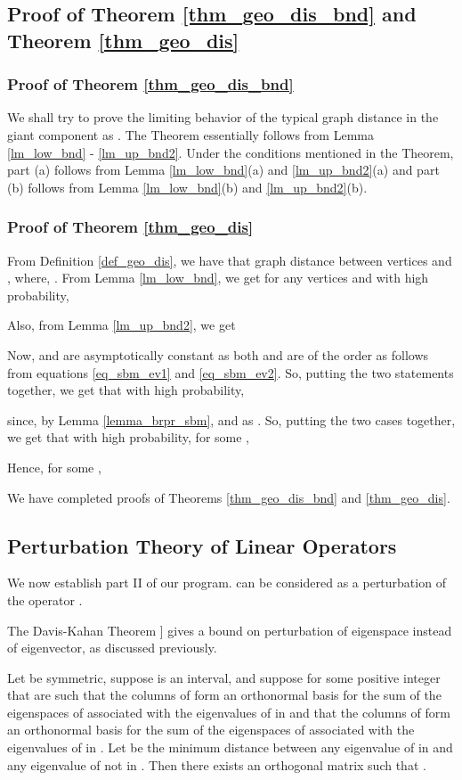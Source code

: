 \documentclass[graybox]{svmult}
\begin{document}
\subsection{Proof of Theorem \ref{thm_geo_dis_bnd} and Theorem \ref{thm_geo_dis}}
\label{sec_det_geo}
\subsubsection{Proof of Theorem \ref{thm_geo_dis_bnd}}
We shall try to prove the limiting behavior of the typical graph distance in the giant component as . The Theorem essentially follows from Lemma \ref{lm_low_bnd} - \ref{lm_up_bnd2}. Under the conditions mentioned in the Theorem, part (a) follows from Lemma \ref{lm_low_bnd}(a) and \ref{lm_up_bnd2}(a) and part (b) follows from Lemma \ref{lm_low_bnd}(b) and \ref{lm_up_bnd2}(b).
\subsubsection{Proof of Theorem \ref{thm_geo_dis}}
From Definition \ref{def_geo_dis}, we have that  graph distance between vertices  and , where, .
From Lemma \ref{lm_low_bnd}, we get for any vertices  and  with high probability, 

Also, from Lemma \ref{lm_up_bnd2}, we get

Now,  and  are asymptotically constant as both  and  are of the order  as follows from equations \eqref{eq_sbm_ev1} and \eqref{eq_sbm_ev2}. So, putting the two statements together, we get that with high probability,

since, by Lemma \ref{lemma_brpr_sbm},  and  as .
So, putting the two cases together, we get that with high probability, for some ,

Hence, for some ,


We have completed proofs of Theorems \ref{thm_geo_dis_bnd} and \ref{thm_geo_dis}.

\subsection{Perturbation Theory of Linear Operators}
\label{sec_det_pert}
We now establish part II of our program.  can be considered as a perturbation of the operator .

The Davis-Kahan Theorem \cite{davis1970rotation}] gives a bound on perturbation of eigenspace instead of eigenvector, as discussed previously. 
\begin{theorem}
\label{thm_dk}
Let  be symmetric, suppose  is an interval, and suppose for some positive integer  that  are such that the columns of  form an orthonormal basis for the sum of the eigenspaces of  associated with the eigenvalues of  in  and that the columns of  form an orthonormal basis for the sum of the eigenspaces of  associated with the eigenvalues of  in . Let  be the minimum distance between any eigenvalue of  in  and any eigenvalue of  not in  . Then there exists an orthogonal matrix  such that .
\end{theorem}
\end{document}
